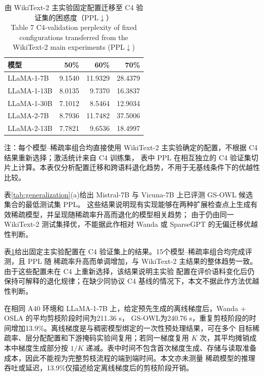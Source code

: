 \documentclass[UTF8,fontset=fandol]{ctexart}
\renewcommand{\arraystretch}{1.08}
\newcommand{\method}{GS-OWL}
\begin{document}
\begin{table}[!htbp]
\centering
\caption{由 WikiText-2 主实验固定配置迁移至 C4 验证集的困惑度（PPL$\downarrow$）\\
Table 7 C4-validation perplexity of fixed configurations transferred from the WikiText-2 main experiments (PPL$\downarrow$)}
\label{tab:c4_validation}
\scriptsize
\setlength{\tabcolsep}{7.0pt}
\renewcommand{\arraystretch}{0.98}
\begin{tabular}{lrrr}
\toprule
模型 & 50\% & 60\% & 70\% \\
\midrule
LLaMA-1-7B  & 9.1540 & 11.9329 & 28.4379 \\
LLaMA-1-13B & 8.0135 & 9.7370  & 16.3837 \\
LLaMA-1-30B & 7.1012 & 8.5464  & 12.9034 \\
LLaMA-2-7B  & 8.7936 & 11.7482 & 37.5006 \\
LLaMA-2-13B & 7.7821 & 9.6536  & 18.4997 \\
\bottomrule
\end{tabular}
\vspace{2pt}
\parbox{0.88\textwidth}{\scriptsize
注：每个模型--稀疏率组合均直接使用 WikiText-2 主实验确定的配置，不根据 C4 结果重新选择；激活统计来自 C4 训练集，
表中 PPL 在相互独立的 C4 验证集切片上计算。本表仅分析配置迁移和跨语料退化趋势，不用于无基线条件下的优越性比较。}
\end{table}

表\ref{tab:generalization}(a)给出 Mistral-7B 与 Vicuna-7B 上已评测 GS-OWL 候选集合的最低测试集 PPL。
这些结果说明现有实现能够在两种扩展检查点上生成有效稀疏模型，并呈现随稀疏率升高而退化的模型相关趋势；
由于仍由同一 WikiText-2 测试集择优，不能据此作相对 Wanda 或 SparseGPT 的无偏迁移优越性判断。

表\ref{tab:c4_validation}给出固定主实验配置在 C4 验证集上的结果。15个模型--稀疏率组合均完成评测，且 PPL 随
稀疏率升高而单调增加，与 WikiText-2 主结果的整体趋势一致。由于这些配置未在 C4 上重新选择，该结果说明主实验
配置在评价语料变化后仍保持可解释的退化规律；在缺少同协议 C4 基线的情况下，本文不据此作方法优越性判断。

在相同 A40 环境和 LLaMA-1-7B 上，给定预先生成的离线梯度后，Wanda + OSLA 的平均剪枝阶段时间为211.36 s，
\method 为240.76 s，重复剪枝阶段的时间增加13.9\%。离线梯度是与稠密模型绑定的一次性预处理结果，可在多个
目标稀疏率、层分配配置和下游掩码实验间复用；若同一梯度复用 $K$ 次，其平均摊销成本中梯度生成部分按 $1/K$
递减。表中时间不包含首次梯度生成、存储与读取准备成本，因此不能视为完整剪枝流程的端到端时间。本文亦未测量
稀疏模型的推理吞吐或延迟，13.9\%仅描述给定离线梯度后的剪枝阶段开销。
\end{document}
